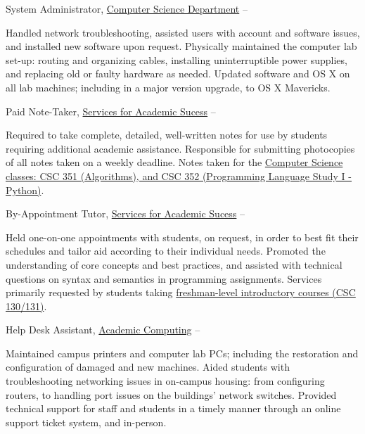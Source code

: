 \documentclass[letterpaper,MMMyyyy,nonstopmode]{simpleresumecv}
\begin{document}
\begin{Body}
\Gap
\BulletItem
System Administrator,
\href{http://cs.rocky.edu}
{Computer Science Department}
\hfill
{} --
\begin{Detail}
\SubBulletItem
Handled network troubleshooting, assisted users with account and software issues, and installed new software upon request.
\SubBulletItem
Physically maintained the computer lab set-up: routing and organizing cables, installing uninterruptible power supplies, and replacing old or faulty hardware as needed.
\SubBulletItem
Updated software and OS X on all lab machines; including in a major version upgrade, to OS X Mavericks.
\end{Detail}

\Gap
\BulletItem
Paid Note-Taker,
\href{https://www.rocky.edu/student-life/student-support/academic-support/ServicesAcademicSuccess.php}
{Services for Academic Sucess}
\hfill
{} --
\begin{Detail}
\SubBulletItem
Required to take complete, detailed, well-written notes for use by students requiring additional academic assistance.
\SubBulletItem
Responsible for submitting photocopies of all notes taken on a weekly deadline.
\SubBulletItem
Notes taken for the \href{https://www.rocky.edu/academics/catalog/program/9/Computer_Science#courses-content}{Computer Science classes: CSC 351 (Algorithms), and CSC 352 (Programming Language Study I - Python)}.
\end{Detail}

\Gap
\BulletItem
By-Appointment Tutor,
\href{https://www.rocky.edu/student-life/student-support/academic-support/ServicesAcademicSuccess.php}
{Services for Academic Sucess}
\hfill
{} --
\begin{Detail}
\SubBulletItem
Held one-on-one appointments with students, on request, in order to best fit their schedules and tailor aid according to their individual needs.
\SubBulletItem
Promoted the understanding of core concepts and best practices, and assisted with technical questions on syntax and semantics in programming assignments.
\SubBulletItem
Services primarily requested by students taking \href{https://www.rocky.edu/academics/catalog/program/9/Computer_Science#courses-content}{freshman-level introductory courses (CSC 130/131)}.
\end{Detail}

\Gap
\BulletItem
Help Desk Assistant,
\href{https://rocky.edu/student-life/student-support/academic-computing/}
{Academic Computing}
\hfill
{} --
\begin{Detail}
\SubBulletItem
Maintained campus printers and computer lab PCs; including the restoration and configuration of damaged and new machines.
\SubBulletItem
Aided students with troubleshooting networking issues in on-campus housing: from configuring routers, to handling port issues on the buildings' network switches.
\SubBulletItem
Provided technical support for staff and students in a timely manner through an online support ticket system, and in-person.
\end{Detail}


\end{Body}
\end{document}
